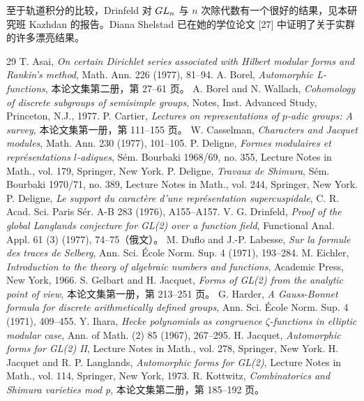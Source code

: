 至于轨道积分的比较，Drinfeld 对 $GL_n$ 与 $n$ 次除代数有一个很好的结果，见本研究班 Kazhdan 的报告。Diana Shelstad 已在她的学位论文 [27] 中证明了关于实群的许多漂亮结果。

\begin{thebibliography}{29}
 T. Asai, \emph{On certain Dirichlet series associated with Hilbert modular forms and Rankin's method}, Math. Ann. 226 (1977), 81--94.
 A. Borel, \emph{Automorphic L-functions}, 本论文集第二册，第 27--61 页。
 A. Borel and N. Wallach, \emph{Cohomology of discrete subgroups of semisimple groups}, Notes, Inst. Advanced Study, Princeton, N.J., 1977.
 P. Cartier, \emph{Lectures on representations of $p$-adic groups: A survey}, 本论文集第一册，第 111--155 页。
 W. Casselman, \emph{Characters and Jacquet modules}, Math. Ann. 230 (1977), 101--105.
 P. Deligne, \emph{Formes modulaires et représentations $l$-adiques}, Sém. Bourbaki 1968/69, no. 355, Lecture Notes in Math., vol. 179, Springer, New York.
 P. Deligne, \emph{Travaux de Shimura}, Sém. Bourbaki 1970/71, no. 389, Lecture Notes in Math., vol. 244, Springer, New York.
 P. Deligne, \emph{Le support du caractère d'une représentation supercuspidale}, C. R. Acad. Sci. Paris Sér. A-B 283 (1976), A155--A157.
 V. G. Drinfeld, \emph{Proof of the global Langlands conjecture for GL(2) over a function field}, Functional Anal. Appl. 61 (3) (1977), 74--75（俄文）。
 M. Duflo and J.-P. Labesse, \emph{Sur la formule des traces de Selberg}, Ann. Sci. École Norm. Sup. 4 (1971), 193--284.
 M. Eichler, \emph{Introduction to the theory of algebraic numbers and functions}, Academic Press, New York, 1966.
 S. Gelbart and H. Jacquet, \emph{Forms of GL(2) from the analytic point of view}, 本论文集第一册，第 213--251 页。
 G. Harder, \emph{A Gauss-Bonnet formula for discrete arithmetically defined groups}, Ann. Sci. École Norm. Sup. 4 (1971), 409--455.
 Y. Ihara, \emph{Hecke polynomials as congruence $\zeta$-functions in elliptic modular case}, Ann. of Math. (2) 85 (1967), 267--295.
 H. Jacquet, \emph{Automorphic forms for GL(2) II}, Lecture Notes in Math., vol. 278, Springer, New York.
 H. Jacquet and R. P. Langlands, \emph{Automorphic forms for GL(2)}, Lecture Notes in Math., vol. 114, Springer, New York, 1973.
 R. Kottwitz, \emph{Combinatorics and Shimura varieties mod p}, 本论文集第二册，第 185--192 页。

\end{thebibliography}

